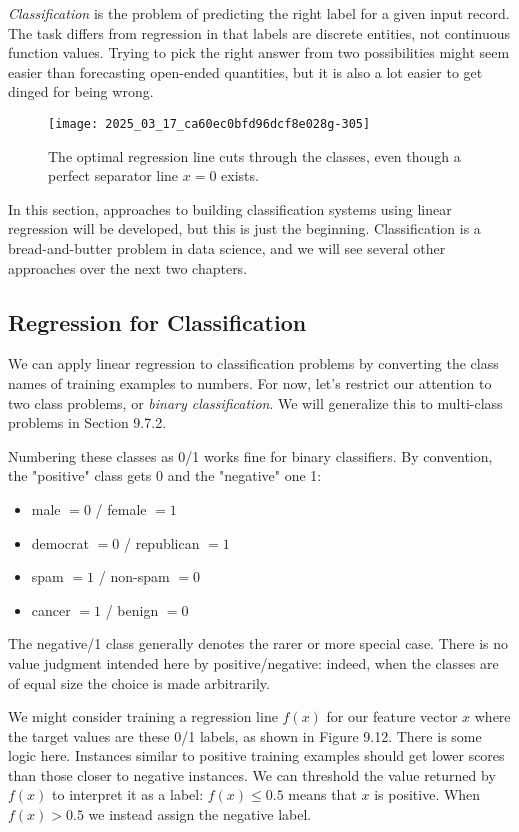 \documentclass[10pt]{article}
\begin{document}
\emph{Classification} is the problem of predicting the right label for a given input record. The task differs from regression in that labels are discrete entities, not continuous function values. Trying to pick the right answer from two possibilities might seem easier than forecasting open-ended quantities, but it is also a lot easier to get dinged for being wrong.

\begin{figure}[h]
    \centering
    \texttt{[image: 2025\_03\_17\_ca60ec0bfd96dcf8e028g-305]}
    \caption{The optimal regression line cuts through the classes, even though a perfect separator line \(x=0\) exists.}
\end{figure}

In this section, approaches to building classification systems using linear regression will be developed, but this is just the beginning. Classification is a bread-and-butter problem in data science, and we will see several other approaches over the next two chapters.

\subsection{Regression for Classification}
We can apply linear regression to classification problems by converting the class names of training examples to numbers. For now, let's restrict our attention to two class problems, or \emph{binary classification}. We will generalize this to multi-class problems in Section 9.7.2.

Numbering these classes as 0/1 works fine for binary classifiers. By convention, the "positive" class gets 0 and the "negative" one 1:

\begin{itemize}
  \item male \(=0\) / female \(=1\)
  \item democrat \(=0\) / republican \(=1\)
  \item spam \(=1\) / non-spam \(=0\)
  \item cancer \(=1\) / benign \(=0\)
\end{itemize}

The negative/1 class generally denotes the rarer or more special case. There is no value judgment intended here by positive/negative: indeed, when the classes are of equal size the choice is made arbitrarily.

We might consider training a regression line \(f(x)\) for our feature vector \(x\) where the target values are these 0/1 labels, as shown in Figure 9.12. There is some logic here. Instances similar to positive training examples should get lower scores than those closer to negative instances. We can threshold the value returned by \(f(x)\) to interpret it as a label: \(f(x) \leq 0.5\) means that \(x\) is positive. When \(f(x) > 0.5\) we instead assign the negative label.
\end{document}
